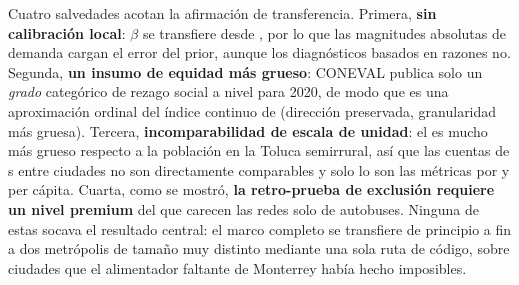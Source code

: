 Cuatro salvedades acotan la afirmación de transferencia. Primera, \textbf{sin
calibración local}: $\beta$ se transfiere desde \zmg, por lo que las magnitudes
absolutas de demanda cargan el error del prior, aunque los diagnósticos basados en
razones no. Segunda, \textbf{un insumo de equidad más grueso}: CONEVAL publica solo un
\emph{grado} categórico de rezago social a nivel \ageb para 2020, de modo que
 es una aproximación ordinal del índice continuo de \zmg (dirección
preservada, granularidad más gruesa). Tercera, \textbf{incomparabilidad de escala de
unidad}: el \ageb es mucho más grueso respecto a la población en la Toluca semirrural,
así que las cuentas de \ageb{}s entre ciudades no son directamente comparables y solo
lo son las métricas por \ageb y per cápita. Cuarta, como se mostró, \textbf{la
retro-prueba de exclusión requiere un nivel premium} del que carecen las redes solo de
autobuses. Ninguna de estas socava el resultado central: el marco completo se
transfiere de principio a fin a dos metrópolis de tamaño muy distinto mediante una sola
ruta de código, sobre ciudades que el alimentador faltante de Monterrey había hecho
imposibles.
